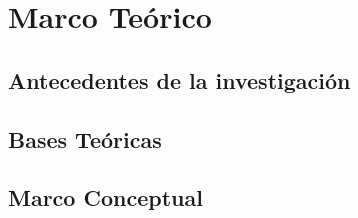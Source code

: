 \chapter{Marco Teórico}
\section{Antecedentes de la investigación}


\section{Bases Teóricas}


\section{Marco Conceptual}

